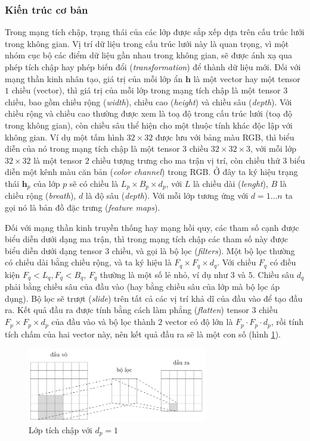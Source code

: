 \subsubsection{Kiến trúc cơ bản}
Trong mạng tích chập, trạng thái của các lớp được sắp xếp dựa trên cấu trúc lưới trong không gian. Vị trí dữ liệu trong cấu trúc lưới này là quan trọng, vì một nhóm cục bộ các điểm dữ liệu gần nhau trong không gian, sẽ được ánh xạ qua phép tích chập hay phép biến đổi (\textit{transformation}) để thành dữ liệu mới. Đối với mạng thần kinh nhân tạo, giá trị của mỗi lớp ẩn $\mathbf h$ là một vector hay một tensor $1$ chiều (vector), thì giá trị của mỗi lớp trong mạng tích chập là một tensor $3$ chiều, bao gồm chiều rộng (\textit{width}), chiều cao (\textit{height}) và chiều sâu (\textit{depth}). Với chiều rộng và chiều cao thường được xem là toạ độ trong cấu trúc lưới (toạ độ trong không gian), còn chiều sâu thể hiện cho một thuộc tính khác độc lập với không gian. Ví dụ một tấm hình $32\times 32$ được lưu với bảng màu RGB, thì biểu diễn của nó trong mạng tích chập là một tensor $3$ chiều $32\times 32\times 3$, với mỗi lớp $32\times 32$ là một tensor $2$ chiều tượng trưng cho ma trận vị trí, còn chiều thứ $3$ biểu diễn một kênh màu căn bản (\textit{color channel}) trong RGB. Ở đây ta ký hiệu trạng thái $\mathbf h_p$ của lớp $p$ sẽ có chiều là $L_p\times B_p\times d_p$, với $L$ là chiều dài (\textit{lenght}), $B$ là chiều rộng (\textit{breath}), $d$ là độ sâu (\textit{depth}). Với mỗi lớp tương ứng với $d=1\dots n$ ta gọi nó là bản đồ đặc trưng (\textit{feature maps}).

Đối với mạng thần kinh truyền thống hay mạng hồi quy, các tham số cạnh được biểu diễn dưới dạng ma trận, thì trong mạng tích chập các tham số này được biểu diễn dưới dạng tensor $3$ chiều, và gọi là bộ lọc (\textit{filters}). Một bộ lọc thường có chiều dài bằng chiều rộng, và ta ký hiệu là $F_q\times F_q\times d_q$. Với chiều $F_q$ có điều kiện $F_q<L_q,F_q<B_q$, $F_q$ thường là một số lẻ nhỏ, ví dụ như $3$ và $5$. Chiều sâu $d_q$ phải bằng chiều sâu của đầu vào (hay bằng chiều sâu của lớp mà bộ lọc áp dụng). Bộ lọc sẽ trượt (\textit{slide}) trên tất cả các vị trí khả dĩ của đầu vào để tạo đầu ra. Kết quả đầu ra được tính bằng cách làm phẳng (\textit{flatten}) tensor $3$ chiều $F_p\times F_p\times d_p$ của đầu vào và bộ lọc thành $2$ vector có độ lớn là $F_p\cdot F_p\cdot d_p$, rồi tính tích chấm của hai vector này, nên kết quả đầu ra sẽ là một con số (hình \ref{figure:convolution-layer}).
\begin{figure}[htb]
    \centering
    \includegraphics[width=0.7\textwidth]{tikz_image/convolution_layer.pdf}
    \caption{Lớp tích chập với $d_p=1$}
    \label{figure:convolution-layer}
\end{figure}

